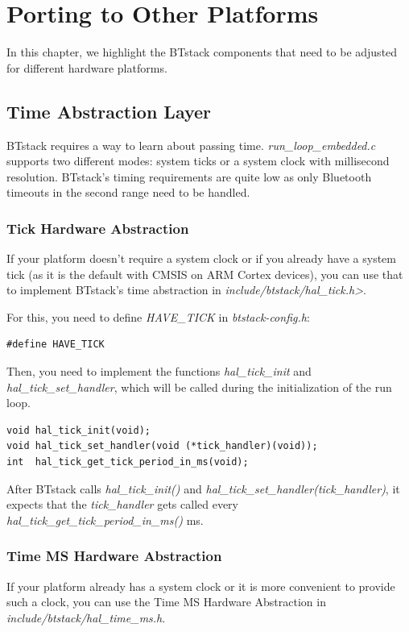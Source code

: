 \documentclass[a4paper,titlepage,oneside,12pt]{amsart} %
\begin{document}
\section{Porting to Other Platforms}

In this chapter, we highlight the BTstack components that need to be adjusted for different hardware platforms.

\subsection{Time Abstraction Layer}
\label{section:timeAbstraction}
BTstack requires a way to learn about passing time. \emph{run\_loop\_embedded.c} supports two different modes: system ticks or a system clock with millisecond resolution. BTstack's timing requirements are quite low as only Bluetooth timeouts in the second range need to be handled.

\subsubsection{Tick Hardware Abstraction}
\label{section:tickAbstraction}

If your platform doesn't require a system clock or if you already have a system tick (as it is the default with CMSIS on ARM Cortex devices), you can use that to implement BTstack's time abstraction in \emph{include/btstack/hal\_tick.h>}.

For this, you need to define \emph{HAVE\_TICK} in \emph{btstack-config.h}:
\begin{lstlisting}
#define HAVE_TICK
\end{lstlisting}

Then, you need to implement the functions \emph{hal\_tick\_init} and \emph{hal\_tick\_set\_handler}, which will be called during the initialization of the run loop.
 
\begin{lstlisting}
void hal_tick_init(void);
void hal_tick_set_handler(void (*tick_handler)(void));
int  hal_tick_get_tick_period_in_ms(void);
\end{lstlisting}
 
After BTstack calls \emph{hal\_tick\_init()} and \emph{hal\_tick\_set\_handler(tick\_handler)}, it expects that the \emph{tick\_handler} gets called every \emph{hal\_tick\_get\_tick\_period\_in\_ms()} ms.

\subsubsection{Time MS Hardware Abstraction}
\label{section:timeMSAbstraction}
If your platform already has a system clock or it is more convenient to provide such a clock, you can use the Time MS Hardware Abstraction in \emph{include/btstack/hal\_time\_ms.h}.
\end{document}
